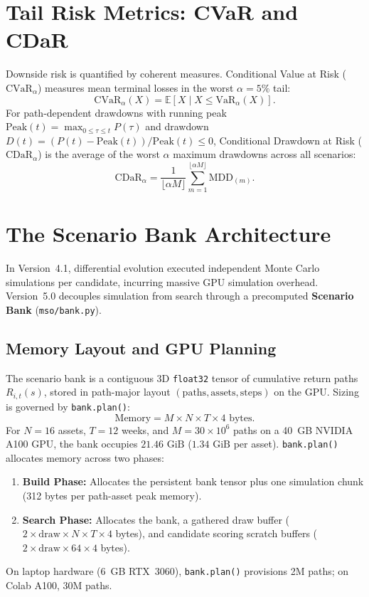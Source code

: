 \documentclass[11pt]{article}
\newcommand{\E}{\mathbb{E}}
\begin{document}
\section{Tail Risk Metrics: CVaR and CDaR}
Downside risk is quantified by coherent measures. Conditional Value at Risk ($\mathrm{CVaR}_\alpha$) measures
mean terminal losses in the worst $\alpha = 5\%$ tail:
\begin{equation}
\mathrm{CVaR}_\alpha(X) = \E[X \mid X \le \mathrm{VaR}_\alpha(X)].
\end{equation}
For path-dependent drawdowns with running peak $\mathrm{Peak}(t) = \max_{0 \le \tau \le t} P(\tau)$ and
drawdown $D(t) = (P(t) - \mathrm{Peak}(t)) / \mathrm{Peak}(t) \le 0$, Conditional Drawdown at Risk
($\mathrm{CDaR}_\alpha$) is the average of the worst $\alpha$ maximum drawdowns across all scenarios:
\begin{equation}
\mathrm{CDaR}_\alpha = \frac{1}{\lfloor \alpha M \rfloor} \sum_{m=1}^{\lfloor \alpha M \rfloor} \mathrm{MDD}_{(m)}.
\end{equation}

\section{The Scenario Bank Architecture}
In Version~4.1, differential evolution executed independent Monte Carlo simulations per candidate, incurring
massive GPU simulation overhead. Version~5.0 decouples simulation from search through a precomputed
\textbf{Scenario Bank} (\texttt{mso/bank.py}).

\subsection{Memory Layout and GPU Planning}
The scenario bank is a contiguous 3D \texttt{float32} tensor of cumulative return paths $R_{i, t}(s)$, stored
in path-major layout $(\text{paths}, \text{assets}, \text{steps})$ on the GPU. Sizing is governed by \texttt{bank.plan()}:
\begin{equation}
\text{Memory} = M \times N \times T \times 4\text{ bytes}.
\end{equation}
For $N=16$ assets, $T=12$ weeks, and $M=30\times 10^6$ paths on a 40~GB NVIDIA A100 GPU, the bank occupies
$21.46\text{ GiB}$ ($1.34\text{ GiB}$ per asset). \texttt{bank.plan()} allocates memory across two phases:
\begin{enumerate}[nosep]
\item \textbf{Build Phase:} Allocates the persistent bank tensor plus one simulation chunk (312 bytes per path-asset peak memory).
\item \textbf{Search Phase:} Allocates the bank, a gathered draw buffer ($2\times \text{draw} \times N \times T \times 4$ bytes),
and candidate scoring scratch buffers ($2\times \text{draw} \times 64 \times 4$ bytes).
\end{enumerate}
On laptop hardware (6~GB RTX~3060), \texttt{bank.plan()} provisions 2M paths; on Colab A100, 30M paths.
\end{document}
